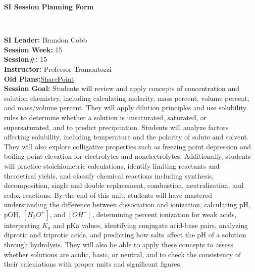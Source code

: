 \documentclass{article}
\begin{document}
\begin{center}
    {\LARGE\textbf{SI Session Planning Form}}
\end{center}

\
\noindent
\begin{flushleft}
\textbf{SI Leader:} Brandon Cobb\\
\textbf{Session Week:} 15\\
\textbf{Session\#:} 15\\
\textbf{Instructor:} Professor Tramontozzi\\
\textbf{Old Plans:}\href{https://macombedu.sharepoint.com/:b:/s/ASC-SupplementalInstructionEmbeddedTutoring/EeSYqCwT_KhMolgJvXbVEjgBOyF_DevvS8BgCm1zPkQQJg?e=QJTt4o}{SharePoint}\\
\textbf{Session Goal:} Students will review and apply concepts of concentration and solution chemistry, including calculating molarity, mass percent, volume percent, and mass/volume percent. They will apply dilution principles and use solubility rules to determine whether a solution is unsaturated, saturated, or supersaturated, and to predict precipitation. Students will analyze factors affecting solubility, including temperature and the polarity of solute and solvent. They will also explore colligative properties such as freezing point depression and boiling point elevation for electrolytes and nonelectrolytes. Additionally, students will practice stoichiometric calculations, identify limiting reactants and theoretical yields, and classify chemical reactions including synthesis, decomposition, single and double replacement, combustion, neutralization, and redox reactions. By the end of this unit, students will have mastered understanding the difference between dissociation and ionization, calculating pH, pOH, \([H_3O^+]\), and \([OH^-]\), determining percent ionization for weak acids, interpreting \(K_a\) and pKa values, identifying conjugate acid-base pairs, analyzing diprotic and triprotic acids, and predicting how salts affect the pH of a solution through hydrolysis. They will also be able to apply these concepts to assess whether solutions are acidic, basic, or neutral, and to check the consistency of their calculations with proper units and significant figures.

\end{flushleft}

\vspace{1em}
\end{document}
